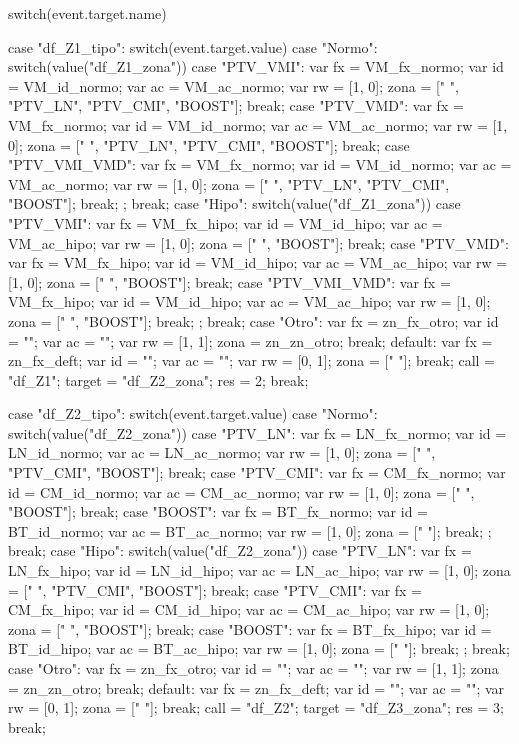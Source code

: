 		switch(event.target.name){

			case "df_Z1_tipo":  
				switch(event.target.value){
					case "Normo": 
						switch(value("df_Z1_zona")){
							case "PTV_VMI":     var fx = VM_fx_normo; var id = VM_id_normo; var ac = VM_ac_normo; var rw = [1, 0]; zona = [" ", "PTV_LN", "PTV_CMI", "BOOST"]; break;
							case "PTV_VMD":     var fx = VM_fx_normo; var id = VM_id_normo; var ac = VM_ac_normo; var rw = [1, 0]; zona = [" ", "PTV_LN", "PTV_CMI", "BOOST"]; break;
							case "PTV_VMI_VMD": var fx = VM_fx_normo; var id = VM_id_normo; var ac = VM_ac_normo; var rw = [1, 0]; zona = [" ", "PTV_LN", "PTV_CMI", "BOOST"]; break;
						}; break;
					case "Hipo":  
						switch(value("df_Z1_zona")){
							case "PTV_VMI":     var fx = VM_fx_hipo; var id = VM_id_hipo;  var ac = VM_ac_hipo;  var rw = [1, 0]; zona = [" ", "BOOST"]; break;
							case "PTV_VMD":     var fx = VM_fx_hipo; var id = VM_id_hipo;  var ac = VM_ac_hipo;  var rw = [1, 0]; zona = [" ", "BOOST"]; break;
							case "PTV_VMI_VMD": var fx = VM_fx_hipo; var id = VM_id_hipo;  var ac = VM_ac_hipo;  var rw = [1, 0]; zona = [" ", "BOOST"]; break;
						}; break;
					case "Otro":            var fx = zn_fx_otro; var id = "";          var ac = "";          var rw = [1, 1]; zona = zn_zn_otro;    break;
					default:                var fx = zn_fx_deft; var id = "";          var ac = "";          var rw = [0, 1]; zona = [" "];         break;
				}
				call = "df_Z1"; target = "df_Z2_zona"; res = 2; break;

			case "df_Z2_tipo":  
				switch(event.target.value){
					case "Normo": 
						switch(value("df_Z2_zona")){
							case "PTV_LN":  var fx = LN_fx_normo; var id = LN_id_normo; var ac = LN_ac_normo; var rw = [1, 0]; zona = [" ", "PTV_CMI", "BOOST"]; break;
							case "PTV_CMI": var fx = CM_fx_normo; var id = CM_id_normo; var ac = CM_ac_normo; var rw = [1, 0]; zona = [" ", "BOOST"];            break;
							case "BOOST":   var fx = BT_fx_normo; var id = BT_id_normo; var ac = BT_ac_normo; var rw = [1, 0]; zona = [" "];                     break;
						}; break;
					case "Hipo":  
						switch(value("df_Z2_zona")){
							case "PTV_LN":  var fx = LN_fx_hipo; var id = LN_id_hipo;  var ac = LN_ac_hipo;  var rw = [1, 0]; zona = [" ", "PTV_CMI", "BOOST"]; break;
							case "PTV_CMI": var fx = CM_fx_hipo; var id = CM_id_hipo;  var ac = CM_ac_hipo;  var rw = [1, 0]; zona = [" ", "BOOST"];            break;
							case "BOOST":   var fx = BT_fx_hipo; var id = BT_id_hipo;  var ac = BT_ac_hipo;  var rw = [1, 0]; zona = [" "];                     break;
						}; break;
					case "Otro":        var fx = zn_fx_otro; var id = "";          var ac = "";          var rw = [1, 1]; zona = zn_zn_otro;                break;
					default:            var fx = zn_fx_deft; var id = "";          var ac = "";          var rw = [0, 1]; zona = [" "];                     break;
				}
				call = "df_Z2"; target = "df_Z3_zona"; res = 3; break;

}
